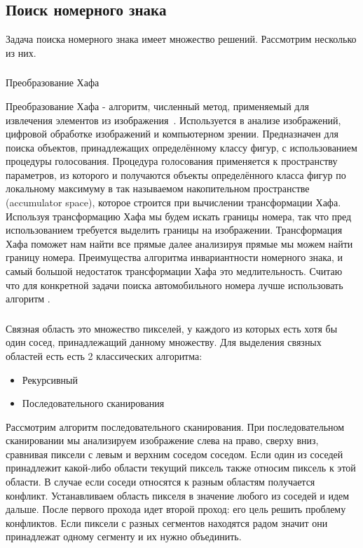 
\subsection{Поиск номерного знака}
\label{sub:domain:search}
Задача поиска номерного знака имеет множество решений. Рассмотрим несколько из них.
\subsubsection{}
\label{sub:domain:search:hought}
Преобразование Хафа

Преобразование Хафа - алгоритм, численный метод, применяемый для извлечения элементов из изображения~\cite{hough_transform}. Используется в анализе изображений, цифровой обработке изображений и компьютерном зрении. Предназначен для поиска объектов, принадлежащих определённому классу фигур, с использованием процедуры голосования. Процедура голосования применяется к пространству параметров, из которого и получаются объекты определённого класса фигур по локальному максимуму в так называемом накопительном пространстве (accumulator space), которое строится при вычислении трансформации Хафа. Используя трансформацию Хафа мы будем искать границы номера, так что пред использованием требуется выделить границы на изображении. Трансформация Хафа поможет нам найти все прямые далее анализируя прямые мы можем найти границу номера. Преимущества алгоритма инвариантности номерного знака, и самый большой недостаток трансформации Хафа это медлительность. Считаю что для конкретной задачи поиска автомобильного номера лучше использовать алгоритм \segmentation.

\subsubsection{}
\label{sub:domain:search:segmentation}
\segmentation{}

Связная область это множество пикселей, у каждого из которых есть хотя бы один сосед, принадлежащий данному множеству. Для выделения связных областей есть есть 2 классических алгоритма:
\begin{itemize}
  \item Рекурсивный
  \item Последовательного сканирования
\end{itemize}
Рассмотрим алгоритм последовательного сканирования. При последовательном сканировании мы анализируем изображение слева на право, сверху вниз, сравнивая пиксели с левым и верхним соседом соседом. Если один из соседей принадлежит какой-либо области текущий пиксель также относим пиксель к этой области. В случае если соседи относятся к разным областям получается конфликт. Устанавливаем область пикселя в значение любого из соседей и идем дальше. После первого прохода идет второй проход: его цель решить проблему конфликтов. Если пиксели с разных сегментов находятся радом значит они принадлежат одному сегменту и их нужно объединить. 

